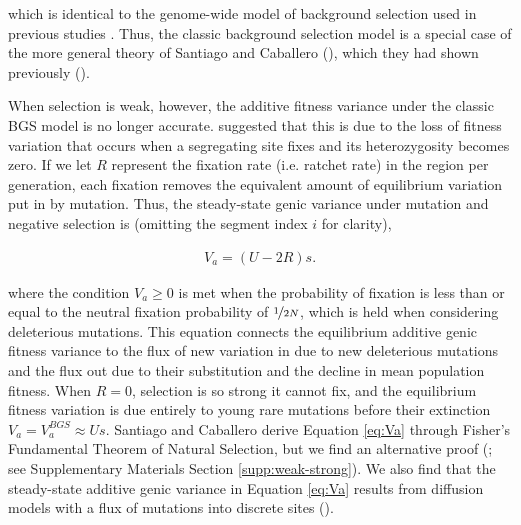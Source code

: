 \documentclass[11pt]{article}
\begin{document}
which is identical to the genome-wide model of background selection used in
previous studies \parencite{McVicker2009-ax,Elyashiv2016-vt,Murphy2022-sj}.
Thus, the classic background selection model is a special case of the more
general theory of Santiago and Caballero (\citeyear{Santiago2016-mu}), which
they had shown previously (\citeyear{Santiago1998-bs}).

When selection is weak, however, the additive fitness variance under the
classic BGS model is no longer accurate. \textcite{Santiago2016-mu} suggested
that this is due to the loss of fitness variation that occurs when a
segregating site fixes and its heterozygosity becomes zero. If we let $R$
represent the fixation rate (i.e. ratchet rate) in the region per generation,
each fixation removes the equivalent amount of equilibrium variation put in by
mutation. Thus, the steady-state genic variance under mutation and negative
selection is (omitting the segment index $i$ for clarity),

\begin{align}
  \label{eq:Va}
  V_{a} = (U - 2 R)s. 
\end{align}

where the condition $V_a \ge 0$ is met when the probability of fixation is less
than or equal to the neutral fixation probability of $\nicefrac{1}{2N}$, which
is held when considering deleterious mutations. This equation connects the
equilibrium additive genic fitness variance to the flux of new variation in due
to new deleterious mutations and the flux out due to their substitution and the
decline in mean population fitness. When $R=0$, selection is so strong it
cannot fix, and the equilibrium fitness variation is due entirely to young rare
mutations before their extinction $V_a = V_a^{BGS} \approx Us$. Santiago and
Caballero derive Equation \eqref{eq:Va} through Fisher's Fundamental Theorem of
Natural Selection, but we find an alternative proof (\cite{Higgs1995-xc}; see
Supplementary Materials Section \ref{supp:weak-strong}). We also find that the
steady-state additive genic variance in Equation \eqref{eq:Va} results from
diffusion models with a flux of mutations into discrete sites
(\cite{Kimura1969-jw}). 

\end{document}
